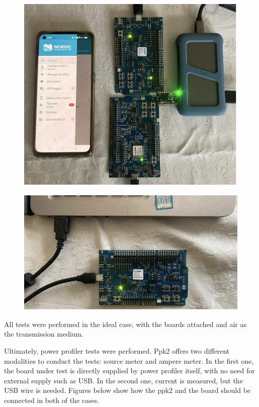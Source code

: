 \documentclass{Configuration_Files/PoliMi3i_thesis}
\begin{document}
\begin{figure}[H]
    \centering
    \includegraphics[scale=0.3]{Test_Procedure/6.png}
    \label{fig:multicentral_implementation}
\end{figure}

\begin{figure}[H]
    \centering
    \includegraphics[scale=0.3]{Test_Procedure/7.png}
    \label{fig:direct_communication_board_PC}
\end{figure}


All tests were performed in the ideal case, with the boards attached and air as the transmission medium.

Ultimately, power profiler tests were performed. Ppk2 offers two different modalities to conduct the tests: source meter and ampere meter. In the first one, the board under test is directly supplied by power profiler itself, with no need for external supply such as USB. In the second one, current is measured, but the USB wire is needed.
Figures below show how the ppk2 and the board should be connected in both of the cases.
\end{document}
